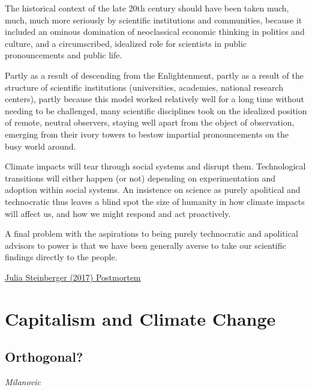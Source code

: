 \documentclass[
]{book}
\begin{document}
The historical context of the late 20th century should have been taken much, much, much more seriously by scientific institutions and communities, because it included an ominous domination of neoclassical economic thinking in politics and culture, and a circumscribed, idealized role for scientists in public pronouncements and public life.

Partly as a result of descending from the Enlightenment, partly as a result of the structure of scientific institutions (universities, academies, national research centers), partly because this model worked relatively well for a long time without needing to be challenged, many scientific disciplines took on the idealized position of remote, neutral observers, staying well apart from the object of observation, emerging from their ivory towers to bestow impartial pronouncements on the busy world around.

Climate impacts will tear through social systems and disrupt them. Technological transitions will either happen (or not) depending on experimentation and adoption within social systems. An insistence on science as purely apolitical and technocratic thus leaves a blind spot the size of humanity in how climate impacts will affect us, and how we might respond and act proactively.

A final problem with the aspirations to being purely technocratic and apolitical advisors to power is that we have been generally averse to take our scientific findings directly to the people.

\href{https://medium.com/age-of-awareness/a-postmortem-for-survival-on-science-failure-and-action-on-climate-change-35636c79971e}{Julia Steinberger (2017) Postmortem}

\hypertarget{capitalism-and-climate-change}{%
\chapter{Capitalism and Climate Change}\label{capitalism-and-climate-change}}

\hypertarget{orthogonal}{%
\section{Orthogonal?}\label{orthogonal}}

\emph{Milanovic}
\end{document}
